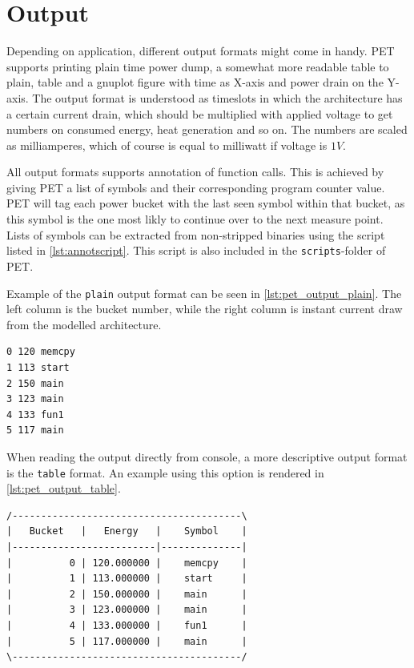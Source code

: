 \section{Output}
Depending on application, different output formats might come in handy. PET
supports printing plain time power dump, a somewhat more readable table to
plain, table and a gnuplot figure with time as X-axis and power drain on the
Y-axis. The output format is understood as timeslots in which the architecture
has a certain current drain, which should be multiplied with applied voltage to
get numbers on consumed energy, heat generation and so on. The numbers are
scaled as milliamperes, which of course is equal to milliwatt if voltage is
$1V$.

All output formats supports annotation of function calls. This is achieved by
giving PET a list of symbols and their corresponding program counter value. PET
will tag each power bucket with the last seen symbol within that bucket, as this
symbol is the one most likly to continue over to the next measure point. Lists
of symbols can be extracted from non-stripped binaries using the script listed
in \autoref{lst:annotscript}. This script is also included in the \texttt{scripts}-folder
of PET.

\begin{minipage}{\textwidth}

\end{minipage}

Example of the \texttt{plain} output format can be seen in
\autoref{lst:pet_output_plain}. The left column is the bucket number, while the
right column is instant current draw from the modelled architecture.

\begin{minipage}{\textwidth}
\begin{lstlisting}[label={lst:pet_output_plain},caption={PET Plain Output}]
0 120 memcpy
1 113 start
2 150 main
3 123 main
4 133 fun1
5 117 main
\end{lstlisting}
\end{minipage}

When reading the output directly from console, a more descriptive output format
is the \texttt{table} format. An example using this option is rendered in
\autoref{lst:pet_output_table}.

\begin{minipage}{\textwidth}
\begin{lstlisting}[label={lst:pet_output_table},caption={PET Table Output}]
/----------------------------------------\
|   Bucket   |   Energy   |    Symbol    |
|-------------------------|--------------|
|          0 | 120.000000 |    memcpy    |
|          1 | 113.000000 |    start     |
|          2 | 150.000000 |    main      |
|          3 | 123.000000 |    main      |
|          4 | 133.000000 |    fun1      |
|          5 | 117.000000 |    main      |
\----------------------------------------/
\end{lstlisting}
\end{minipage}

